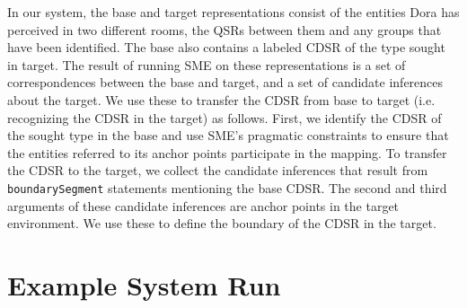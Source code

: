 \documentclass[letterpaper]{article}
\newcommand{\fw}[1]{\texttt{#1}}
\begin{document}

In our system, the base and target representations consist of the entities Dora has perceived in two different rooms, the QSRs between them and any groups that have been identified. The base also contains a labeled CDSR of the type sought in target. The result of running SME on these representations is a set of correspondences between the base and target, and a set of candidate inferences about the target. We use these to transfer the CDSR from base to target (i.e. recognizing the CDSR in the target) as follows. First, we identify the CDSR of the sought type in the base and use SME's pragmatic constraints to ensure that the entities referred to its anchor points participate in the mapping. To transfer the CDSR to the target, we collect the candidate inferences that result from \fw{boundarySegment} statements mentioning the base CDSR. The second and third arguments of these candidate inferences are anchor points in the target environment. We use these to define the boundary of the CDSR in the target.

\section{Example System Run}\label{sec:example}
\end{document}
